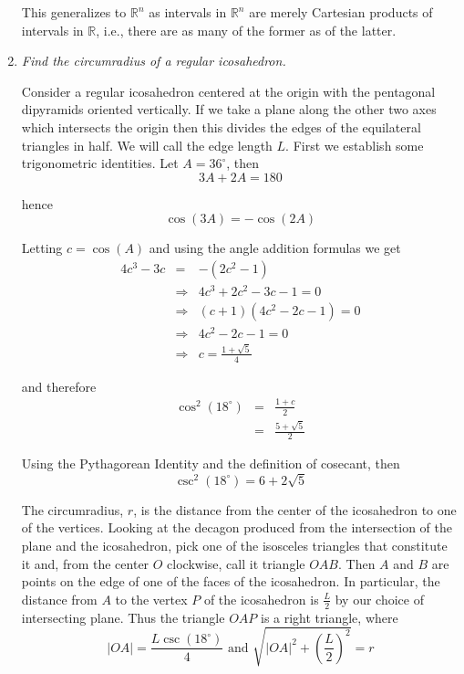 \documentclass[11pt]{article}
\newcommand{\R}{\mathbb{R}}
\begin{document}
\begin{enumerate}
This generalizes to $\R^n$ as intervals in $\R^n$ are merely Cartesian products of intervals in $\R$, i.e., there are as many of the former as of the latter.

\item \emph{Find the circumradius of a regular icosahedron.}

Consider a regular icosahedron centered at the origin with the pentagonal dipyramids oriented vertically.  If we take a plane along the other two axes which intersects the origin then this divides the edges of the equilateral triangles in half.  We will call the edge length $L$.  First we establish some trigonometric identities.  Let $A = 36^\circ$, then
\[
3A + 2A = 180
\]

hence
\[
\cos(3A) = -\cos(2A)
\]

Letting $c = \cos(A)$ and using the angle addition formulas we get
\begin{eqnarray*}
4c^3 - 3c &=& -(2c^2 -1) \\
&\Rightarrow&4c^3 + 2c^2 - 3c -1 = 0 \\
&\Rightarrow&(c+1)(4c^2 - 2c - 1) = 0 \\
&\Rightarrow& 4c^2 - 2c -1 = 0 \\
&\Rightarrow& c = \frac{1+\sqrt{5}}{4}
\end{eqnarray*}

and therefore
\begin{eqnarray*}
\cos^2(18^\circ) &=& \frac{1+c}{2} \\
&=& \frac{5 + \sqrt{5}}{2}
\end{eqnarray*}

Using the Pythagorean Identity and the definition of cosecant, then
\begin{equation}
\label{csc_sq_18}
\csc^2(18^\circ) = 6 + 2\sqrt{5}
\end{equation}

The circumradius, $r$, is the distance from the center of the icosahedron to one of the vertices.  Looking at the decagon produced from the intersection of the plane and the icosahedron, pick one of the isosceles triangles that constitute it and, from the center $O$ clockwise, call it triangle $OAB$.  Then $A$ and $B$ are points on the edge of one of the faces of the icosahedron.  In particular, the distance from $A$ to the vertex $P$ of the icosahedron is $\frac{L}{2}$ by our choice of intersecting plane.  Thus the triangle $OAP$ is a right triangle, where
\[
|OA| = \frac{L \csc(18^\circ)}{4} \mbox{ and } \sqrt{|OA|^2 + \left(\frac{L}{2}\right)^2} = r
\]


\end{enumerate}
\end{document}
